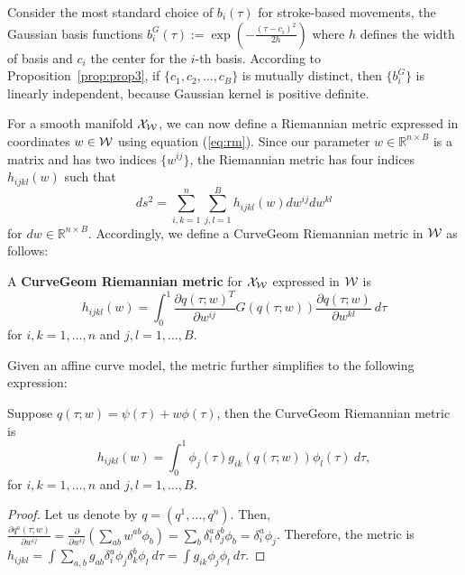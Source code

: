 Consider the most standard choice of $b_i(\tau)$ for stroke-based movements, the Gaussian basis functions $b_i^G(\tau):=\exp(-\frac{(\tau - c_i)^2}{2h})$ where $h$ defines the width of basis and $c_i$ the center for the $i$-th basis. According to Proposition~\ref{prop:prop3}, if $\{c_1,c_2, \ldots, c_B\}$ is mutually distinct, then $\{b_i^G\}$ is linearly independent, because Gaussian kernel is positive definite.

For a smooth manifold ${\cal X}_{\cal W}$, we can now define a Riemannian metric expressed in coordinates $w\in{\cal W}$ using equation (\ref{eq:rm}). 
Since our parameter $w \in \mathbb{R}^{n \times B}$ is a matrix and has two indices $\{w^{ij}\}$, the Riemannian metric has four indices $h_{ijkl}(w)$ such that 
\begin{equation}
    ds^2 = \sum_{i,k=1}^{n} \sum_{j,l=1}^{B} h_{ijkl} (w) dw^{ij} dw^{kl}
\end{equation}
for $dw \in \mathbb{R}^{n \times B}$. Accordingly, we define a CurveGeom Riemannian metric in ${\cal W}$ as follows:
\begin{definition}
A {\bf CurveGeom Riemannian metric} for ${\cal X}_{\cal W}$ expressed in ${\cal W}$
is 
\label{eq:cgrm}
    \begin{equation}
        h_{ijkl}(w) = \int_{0}^1 \frac{\partial q(\tau; w)^T}{\partial w^{ij}} G(q(\tau;w)) \frac{\partial q(\tau; w)}{\partial w^{kl}} \ d \tau
    \end{equation}
    for $i,k=1,\ldots,n$ and $j,l=1,\ldots,B$.
\end{definition}

Given an affine curve model, the metric further simplifies to the following expression:
\begin{prop}
    Suppose $q(\tau; w) = \psi(\tau) + w\phi(\tau)$, then the CurveGeom Riemannian metric is 
    \begin{equation}
    \label{eq:hijkl}
        h_{ijkl}(w) = \int_{0}^{1} \phi_{j}(\tau) g_{ik}(q(\tau; w)) \phi_{l}(\tau) \: d\tau,
    \end{equation}
    for $i,k=1,\ldots,n$ and $j,l=1,\ldots,B$.  
\end{prop}
\begin{proof}
    Let us denote by $q = (q^1, \ldots, q^n)$. Then, $\frac{\partial q^a(\tau; w)}{\partial w^{ij}} = \frac{\partial }{\partial w^{ij}} (\sum_{ab}w^{ab}\phi_{b}) = \sum_{b}\delta_i^a \delta_j^b \phi_b = \delta_i^a \phi_j$. Therefore, the metric is $h_{ijkl} = \int \sum_{a,b} g_{ab} \delta_i^a \phi_j  \delta_k^b \phi_l \ d\tau = \int g_{ik} \phi_j \phi_l \ d\tau$.
\end{proof}


